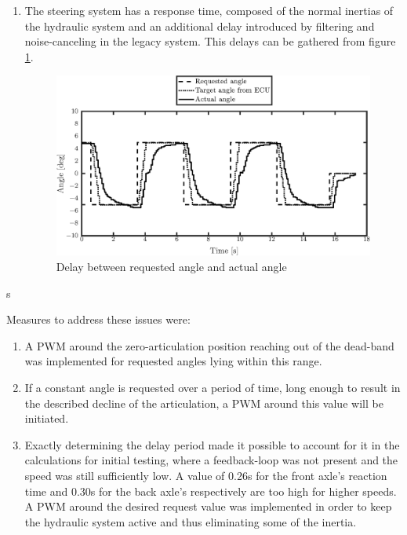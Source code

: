 \documentclass[root.tex]{subfiles}
\begin{document}
\begin{enumerate}
		\item The steering system has a response time, composed of the normal inertias of the hydraulic system and an additional delay introduced by filtering and noise-canceling in the legacy system. This delays can be gathered from figure \ref{fig:Step_input_request}.
		
		\begin{figure}[!h]
			
			\includegraphics[width=1\linewidth]{Step_input_request}
			\caption[Delay between requested and actual angle]{Delay between requested angle and actual angle}
			
			\label{fig:Step_input_request}
		\end{figure}
		
	\end{enumerate}
	
	s
	
	
	Measures to address these issues were:
	
	\begin{enumerate}
		\item A \gls{PWM} around the zero-articulation position reaching out of the dead-band was implemented for requested angles lying within this range. 
		
		\item If a constant angle is requested over a period of time, long enough to result in the described decline of the articulation, a \gls{PWM} around this value will be initiated. 
		
		\item Exactly determining the delay period made it possible to account for it in the calculations for initial testing, where a feedback-loop was not present and the speed was still sufficiently low. A value of 0.26\unit{s} for the front axle's reaction time and 0.30\unit{s} for the back axle's respectively are too high for higher speeds.\\
		A \gls{PWM} around the desired request value was implemented in order to keep the hydraulic system active and thus eliminating some of the inertia. 
	\end{enumerate}
	
	
	
	
	
	
\end{document}
